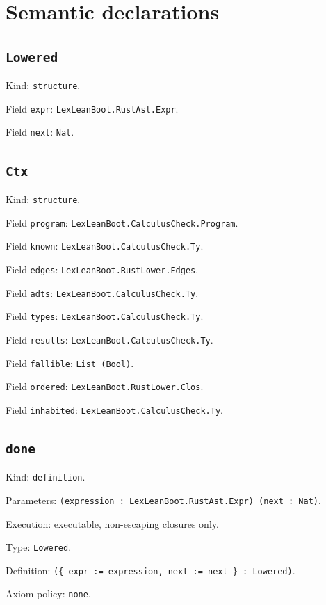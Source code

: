 \documentclass[11pt]{article}
\begin{document}
\section*{Semantic declarations}
\subsection*{\texttt{Lowered}}
\noindent Kind: \texttt{structure}.\par
\noindent Field \texttt{expr}: \texttt{LexLeanBoot.RustAst.Expr}.\par
\noindent Field \texttt{next}: \texttt{Nat}.\par
\subsection*{\texttt{Ctx}}
\noindent Kind: \texttt{structure}.\par
\noindent Field \texttt{program}: \texttt{LexLeanBoot.CalculusCheck.Program}.\par
\noindent Field \texttt{known}: \texttt{LexLeanBoot.CalculusCheck.Ty}.\par
\noindent Field \texttt{edges}: \texttt{LexLeanBoot.RustLower.Edges}.\par
\noindent Field \texttt{adts}: \texttt{LexLeanBoot.CalculusCheck.Ty}.\par
\noindent Field \texttt{types}: \texttt{LexLeanBoot.CalculusCheck.Ty}.\par
\noindent Field \texttt{results}: \texttt{LexLeanBoot.CalculusCheck.Ty}.\par
\noindent Field \texttt{fallible}: \texttt{List (Bool)}.\par
\noindent Field \texttt{ordered}: \texttt{LexLeanBoot.RustLower.Clos}.\par
\noindent Field \texttt{inhabited}: \texttt{LexLeanBoot.CalculusCheck.Ty}.\par
\subsection*{\texttt{done}}
\noindent Kind: \texttt{definition}.\par
\noindent Parameters: \texttt{(expression : LexLeanBoot.RustAst.Expr) (next : Nat)}.\par
\noindent Execution: executable, non-escaping closures only.\par
\noindent Type: \texttt{Lowered}.\par
\noindent Definition: \texttt{(\{ expr := expression, next := next \} : Lowered)}.\par
\noindent Axiom policy: \texttt{none}.\par
\end{document}
